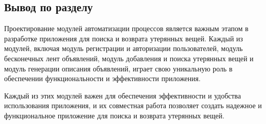 \subsection*{Вывод по разделу}

Проектирование модулей автоматизации процессов является важным этапом в разработке приложения для поиска и возврата утерянных вещей. Каждый из модулей, включая модуль регистрации и авторизации пользователей, модуль бесконечных лент объявлений, модуль добавления и поиска утерянных вещей и модуль генерации описания объявлений, играет свою уникальную роль в обеспечении функциональности и эффективности приложения.

Каждый из этих модулей важен для обеспечения эффективности и удобства использования приложения, и их совместная работа позволяет создать надежное и функциональное приложение для поиска и возврата утерянных вещей.